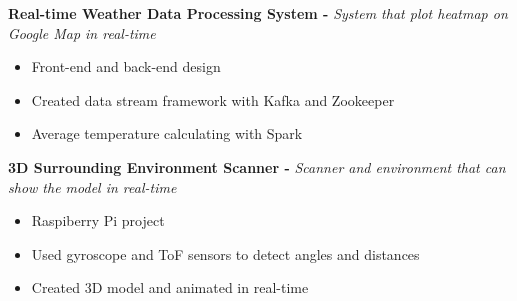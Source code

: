 \documentclass[10pt,a4paper]{altacv}
\begin{document}
\divider

%


\textcolor{emphasis}{\textbf{Real-time Weather Data Processing System - } \textit{System that plot heatmap on Google Map in real-time} } 

\begin{itemize}
\item Front-end and back-end design 
\item Created data stream framework with Kafka and Zookeeper
\item Average temperature calculating with Spark
\end{itemize}

\divider


\textcolor{emphasis}{\textbf{3D Surrounding Environment Scanner - } \textit{Scanner and environment that can show the model in real-time} } 

\begin{itemize}
\item Raspiberry Pi project
\item Used gyroscope and ToF sensors to detect angles and distances
\item Created 3D model and animated in real-time
\end{itemize}

\end{document}

